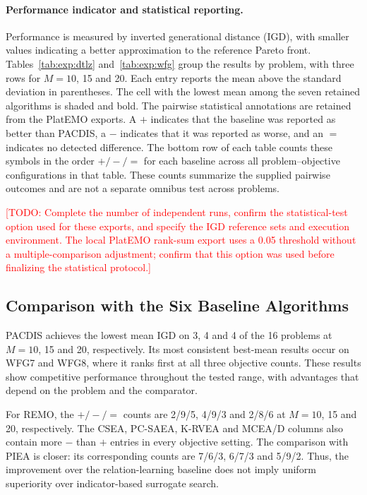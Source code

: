 \documentclass[final,5p,times,twocolumn]{elsarticle}
\newcommand{\TODO}[1]{\textcolor{red}{[TODO: #1]}}
\begin{document}
\paragraph{Performance indicator and statistical reporting.}
Performance is measured by inverted generational distance (IGD), with
smaller values indicating a better approximation to the reference Pareto
front. Tables~\ref{tab:exp:dtlz} and~\ref{tab:exp:wfg} group the results by
problem, with three rows for $M=10$, 15 and 20. Each entry reports the mean
above the standard deviation in parentheses. The cell with the lowest mean
among the seven retained algorithms is shaded and bold. The pairwise statistical annotations
are retained from the PlatEMO exports. A $+$ indicates that the baseline
was reported as better than PACDIS, a $-$ indicates that it was reported as
worse, and an $=$ indicates no detected difference. The bottom row of each
table counts these symbols in the order $+/-/=$ for each baseline across
all problem--objective configurations in that table. These counts summarize
the supplied pairwise outcomes and are not a separate omnibus test across problems.

\TODO{Complete the number of independent runs, confirm the statistical-test
option used for these exports, and specify the IGD reference sets and
execution environment. The local PlatEMO rank-sum export uses a 0.05
threshold without a multiple-comparison adjustment; confirm that this option
was used before finalizing the statistical protocol.}

\subsection{Comparison with the Six Baseline Algorithms}
\label{sec:exp:comparison}

PACDIS achieves the lowest mean IGD on 3, 4 and 4 of the 16 problems at
$M=10$, 15 and 20, respectively. Its most consistent best-mean results occur
on WFG7 and WFG8, where it ranks first at all three objective counts.
These results show competitive performance throughout the tested range,
with advantages that depend on the problem and the comparator.




For REMO, the $+/-/=$ counts are 2/9/5, 4/9/3 and 2/8/6 at
$M=10$, 15 and 20, respectively. The CSEA, PC-SAEA, K-RVEA and MCEA/D
columns also contain more $-$ than $+$ entries in every objective setting.
The comparison with PIEA is closer: its corresponding counts are 7/6/3,
6/7/3 and 5/9/2. Thus, the improvement over the relation-learning baseline
does not imply uniform superiority over indicator-based surrogate search.
\end{document}
